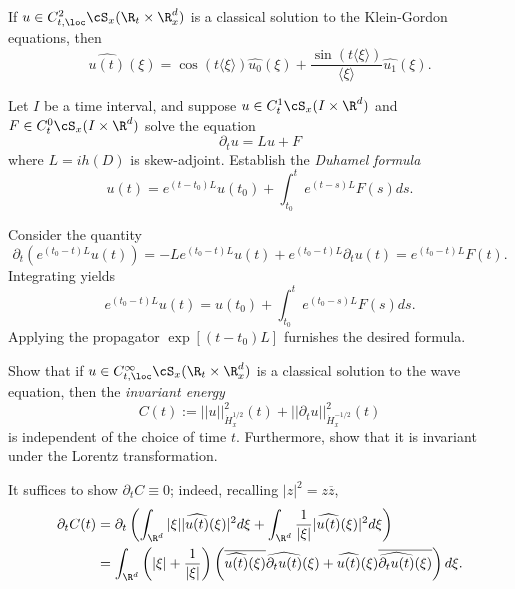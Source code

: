 \begin{statement}
	If $u \in C^2_{t, \loc} \cS_x (\R_t \times \R^d_x)$ is a classical solution to the Klein-Gordon equations, then 
		\[ \widehat{u(t)} (\xi) = \cos(t \langle \xi \rangle) \widehat{u_0} (\xi) + \frac{\sin (t \langle \xi\rangle)}{\langle \xi \rangle} \widehat{u_1} (\xi). \]
\end{statement}

\begin{solution}

\end{solution}

\begin{statement}
	Let $I$ be a time interval, and suppose $u \in C^1_t \cS_x (I \times \R^d)$ and $F \in C^0_t \cS_x (I \times \R^d)$ solve the equation
		\[ \partial_t u = Lu + F \]
	where $L = i h(D)$ is skew-adjoint. Establish the \textit{Duhamel formula}
		\[ u(t) = e^{(t - t_0) L} u(t_0) + \int_{t_0}^t e^{(t - s) L} F(s) ds. \]
\end{statement}

\begin{solution}
	Consider the quantity
		\[ \partial_t \left( e^{(t_0 - t)L} u(t) \right)  = -L e^{(t_0 - t)L} u(t) + e^{(t_0 - t) L} \partial_t u(t) = e^{(t_0 - t) L} F(t). \]
	Integrating yields
		\[  e^{(t_0 - t) L} u(t) = u(t_0) + \int_{t_0}^t e^{(t_0 - s) L} F(s) ds.  \]	
	Applying the propagator $\exp [(t - t_0) L]$ furnishes the desired formula. 	
\end{solution}

\begin{statement}
	Show that if $u \in C^\infty_{t, \loc} \cS_x (\R_t \times \R^d_x)$ is a classical solution to the wave equation, then the \textit{invariant energy}
		\[ C(t) := ||u||^2_{\dot H^{1/2}_x} (t) + ||\partial_t u ||^2_{\dot H^{-1/2}_x} (t) \]
	is independent of the choice of time $t$. Furthermore, show that it is invariant under the Lorentz transformation. 	
\end{statement}

\begin{solution}
	It suffices to show $\partial_t C \equiv 0$; indeed, recalling $|z|^2 = z \overline z$, 
		\begin{align*}
			\partial_t C(t) 
				&= \partial_t \left(\int_{\R^d}  |\xi| |\widehat {u(t)} (\xi)|^2 d \xi + \int_{\R^d}  \frac{1}{|\xi|} |\widehat{u(t)} (\xi)|^2 d \xi\right) \\
				&= \int_{\R^d} \left(|\xi| + \frac{1}{|\xi|}  \right) \left( \overline{\widehat{u(t)} (\xi)} \widehat{\partial_t u(t)} (\xi) + \widehat{u(t)} (\xi) \overline{\widehat{\partial_t u(t)} (\xi)} \right) d \xi.
		\end{align*}		
\end{solution}

